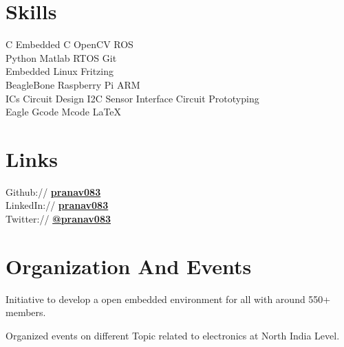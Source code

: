 \documentclass[]{font}
\begin{document}
\begin{minipage}[t]{0.30\textwidth}
\section{Skills}
C \textbullet{}  Embedded C \textbullet{} OpenCV \textbullet{} ROS \\
Python \textbullet{} Matlab \textbullet{} RTOS   \textbullet{} Git \\
Embedded Linux \textbullet{} Fritzing \\ 
BeagleBone \textbullet{} Raspberry Pi \textbullet{} ARM \\
 ICs \textbullet{} Circuit Design \textbullet{} I2C \textbullet{} Sensor Interface \textbullet{} Circuit Prototyping  \\
Eagle \textbullet{} Gcode \textbullet{} Mcode \textbullet{} \LaTeX\ \\
\sectionsep



\section{Links} 
Github://   \href{https://github.com/pranav083}{\bf pranav083} \\
LinkedIn:// \href{https://www.linkedin.com/in/pranav083}{\bf pranav083} \\
Twitter://  \href{https://twitter.com/pranav083}{\bf @pranav083} \\




\section{Organization And Events}
\textbullet{}Initiative to develop a open embedded environment for all with around 550+ members.
\sectionsep

\vspace{\topsep} %
\textbullet{}Organized events on different Topic related to electronics at North India Level.
\sectionsep


%
%

\end{minipage} 
\end{document}
